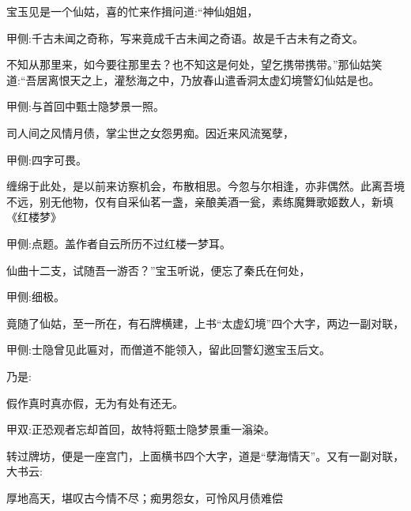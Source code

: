\begin{parag}
    宝玉见是一个仙姑，喜的忙来作揖问道:“神仙姐姐，\begin{note}甲侧:千古未闻之奇称，写来竟成千古未闻之奇语。故是千古未有之奇文。\end{note}不知从那里来，如今要往那里去？也不知这是何处，望乞携带携带。”那仙姑笑道:“吾居离恨天之上，灌愁海之中，乃放春山遣香洞太虚幻境警幻仙姑是也。\begin{note}甲侧:与首回中甄士隐梦景一照。\end{note}司人间之风情月债，掌尘世之女怨男痴。因近来风流冤孽，\begin{note}甲侧:四字可畏。\end{note}缠绵于此处，是以前来访察机会，布散相思。今忽与尔相逢，亦非偶然。此离吾境不远，别无他物，仅有自采仙茗一盏，亲酿美酒一瓮，素练魔舞歌姬数人，新填《红楼梦》\begin{note}甲侧:点题。盖作者自云所历不过红楼一梦耳。\end{note}仙曲十二支，试随吾一游否？”宝玉听说，便忘了秦氏在何处，\begin{note}甲侧:细极。\end{note}竟随了仙姑，至一所在，有石牌横建，上书“太虚幻境”四个大字，两边一副对联，\begin{note}甲侧:士隐曾见此匾对，而僧道不能领入，留此回警幻邀宝玉后文。\end{note}乃是:
\end{parag}


\begin{poem}
    \begin{pl}假作真时真亦假，无为有处有还无。\end{pl}\begin{note}甲双:正恐观者忘却首回，故特将甄士隐梦景重一滃染。\end{note}
\end{poem}


\begin{parag}
    转过牌坊，便是一座宫门，上面横书四个大字，道是“孽海情天”。又有一副对联，大书云:
\end{parag}


\begin{poem}
    \begin{pl}厚地高天，堪叹古今情不尽；痴男怨女，可怜风月债难偿\end{pl}
\end{poem}


